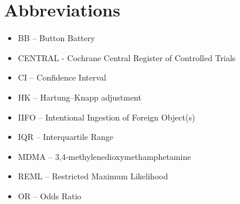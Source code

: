 \section*{Abbreviations}

\begin{itemize}
  \item BB -- Button Battery
  \item CENTRAL - Cochrane Central Register of Controlled Trials
  \item CI -- Confidence Interval
  \item HK -- Hartung–Knapp adjustment
  \item IIFO -- Intentional Ingestion of Foreign Object(s)
  \item IQR -- Interquartile Range
  \item MDMA -- 3,4-methylenedioxymethamphetamine
  \item REML -- Restricted Maximum Likelihood
  \item OR -- Odds Ratio
\end{itemize}
